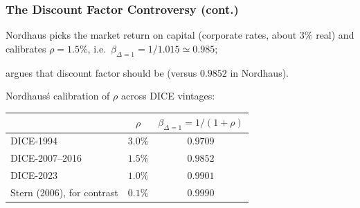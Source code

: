 \documentclass[xcolor=x11names,compress,aspectratio=169]{beamer}%
\makeatletter
\newenvironment{stepitemizewithalert}{\begin{itemize}[<+-| alert@+>]}{\end{itemize} }
\renewenvironment{itemize}{\begin{compactitemize}[<+-| alert@+>]}{\end{compactitemize}}
\renewenvironment{stepitemizewithalert}{\begin{compactitemize}[<+-| alert@+>]}{\end{compactitemize}}
\renewenvironment{stepitemizewithalert}{\begin{itemize}}{\end{itemize}}
\makeatother
\begin{document}
\begin{frame}%
%

\frametitle{The Discount Factor Controversy (cont.)}%


\begin{stepitemizewithalert}
\item Nordhaus picks the market return on capital (corporate rates, about
$3\%$ real) and calibrates $\rho=1.5\%$, i.e.\ $\beta_{\Delta=1}=1/1.015\simeq
0.985$;%
\vspace{1.5ex}%


\item \cite{stern2006stern} argues that discount factor should be
 (versus $0.9852$ in Nordhaus).
\end{stepitemizewithalert}

\medskip
Nordhaus\'s calibration of $\rho$ across DICE vintages:

\begin{center}%
\begin{tabular}[c]{lcc}
\toprule & $\rho$ & $\beta_{\Delta=1}=1/(1+\rho)$\\
\midrule DICE-1994 & $3.0\%$ & $0.9709$\\
DICE-2007--2016 & $1.5\%$ & $0.9852$\\
DICE-2023 & $1.0\%$ & $0.9901$\\
\midrule Stern (2006), for contrast & $0.1\%$ & $0.9990$\\
\bottomrule
\end{tabular}
\end{center}

%

\transboxout
\end{frame}%
%
\end{document}
